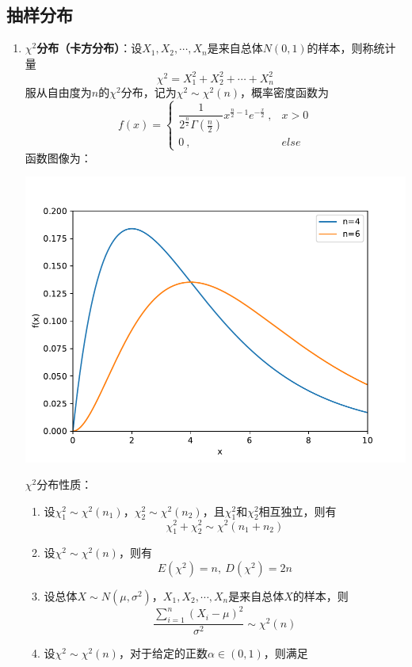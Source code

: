 \documentclass[12pt,a4paper,UTF8]{book}
\begin{document}
\subsection{抽样分布}
\begin{enumerate}
\item \textbf{$\chi^2$分布（卡方分布）}：设$X_1,X_2,\cdots,X_n$是来自总体$N\left(0,1\right)$的样本，则称统计量
\[\chi^2=X_1^2+X_2^2+\cdots+X_n^2\]
服从自由度为$n$的$\chi^2$分布，记为$\chi^2\sim\chi^2\left(n\right)$，概率密度函数为
\[f\left(x\right)=\left\{\begin{matrix}\dfrac{1}{2^{\frac{n}{2}}\Gamma\left(\frac{n}{2}\right)}x^{\frac{n}{2}-1}e^{-\frac{x}{2}}\ ,&x>0\\0\ ,&else\end{matrix}\right.\]
函数图像为：
\begin{center}\includegraphics[scale=0.6]{./figure/chi.pdf}\end{center}
$\chi^2$分布性质：
\begin{enumerate}
\item 设$\chi_1^2\sim\chi^2\left(n_1\right)$，$\chi_2^2\sim\chi^2\left(n_2\right)$，且$\chi_1^2$和$\chi_2^2$相互独立，则有
\[\chi_1^2+\chi_2^2\sim\chi^2\left(n_1+n_2\right)\]
\item 设$\chi^2\sim\chi^2\left(n\right)$，则有
\[E\left(\chi^2\right)=n,\ D\left(\chi^2\right)=2n\]
\item 设总体$X\sim N\left(\mu,\sigma^2\right)$，$X_1,X_2,\cdots,X_n$是来自总体$X$的样本，则
\[\frac{\sum\limits_{i=1}^{n}\left(X_i-\mu\right)^2}{\sigma^2}\sim\chi^2\left(n\right)\]
\item 设$\chi^2\sim\chi^2\left(n\right)$，对于给定的正数$\alpha\in\left(0,1\right)$，则满足

\end{enumerate}
\end{enumerate}
\end{document}
